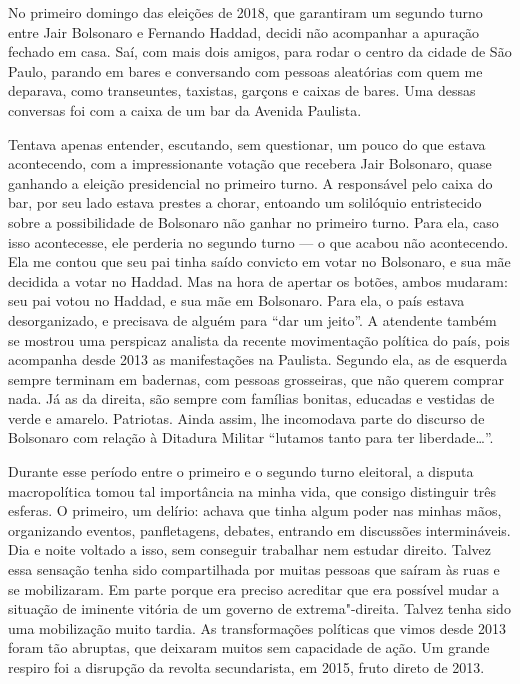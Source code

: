 No primeiro domingo das eleições de 2018, que garantiram um segundo
turno entre Jair Bolsonaro e Fernando Haddad, decidi não acompanhar a
apuração fechado em casa. Saí, com mais dois amigos, para rodar o centro
da cidade de São Paulo, parando em bares e conversando com pessoas
aleatórias com quem me deparava, como transeuntes, taxistas, garçons e
caixas de bares. Uma dessas conversas foi com a caixa de um bar da
Avenida Paulista.

Tentava apenas entender, escutando, sem questionar, um pouco do que
estava acontecendo, com a impressionante votação que recebera Jair
Bolsonaro, quase ganhando a eleição presidencial no primeiro turno. A
responsável pelo caixa do bar, por seu lado estava prestes a chorar,
entoando um solilóquio entristecido sobre a possibilidade de Bolsonaro
não ganhar no primeiro turno. Para ela, caso isso acontecesse, ele
perderia no segundo turno --- o que acabou não acontecendo. Ela me contou
que seu pai tinha saído convicto em votar no Bolsonaro, e sua mãe
decidida a votar no Haddad. Mas na hora de apertar os botões, ambos
mudaram: seu pai votou no Haddad, e sua mãe em Bolsonaro. Para ela, o
país estava desorganizado, e precisava de alguém para ``dar um jeito''.
A atendente também se mostrou uma perspicaz analista da recente
movimentação política do país, pois acompanha desde 2013 as
manifestações na Paulista. Segundo ela, as de esquerda sempre terminam
em badernas, com pessoas grosseiras, que não querem comprar nada. Já as
da direita, são sempre com famílias bonitas, educadas e vestidas de
verde e amarelo. Patriotas. Ainda assim, lhe incomodava parte do
discurso de Bolsonaro com relação à Ditadura Militar ``lutamos tanto
para ter liberdade\ldots{}''.

Durante esse período entre o primeiro e o segundo turno eleitoral, a
disputa macropolítica tomou tal importância na minha vida, que consigo
distinguir três esferas. O primeiro, um delírio: achava que tinha algum
poder nas minhas mãos, organizando eventos, panfletagens, debates,
entrando em discussões intermináveis. Dia e noite voltado a isso, sem
conseguir trabalhar nem estudar direito. Talvez essa sensação tenha sido
compartilhada por muitas pessoas que saíram às ruas e se mobilizaram. Em
parte porque era preciso acreditar que era possível mudar a situação de
iminente vitória de um governo de extrema"-direita. Talvez tenha sido uma
mobilização muito tardia. As transformações políticas que vimos desde
2013 foram tão abruptas, que deixaram muitos sem capacidade de ação. Um
grande respiro foi a disrupção da revolta secundarista, em 2015, fruto
direto de 2013.

